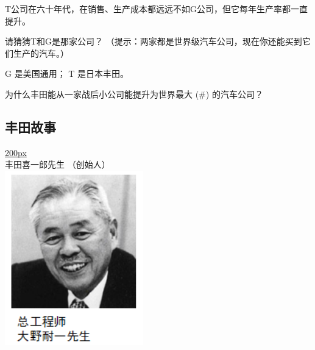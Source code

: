 T公司在六十年代，在销售、生产成本都远远不如G公司，但它每年生产率都一直提升。

请猜猜T和G是那家公司？
（提示：两家都是世界级汽车公司，现在你还能买到它们生产的汽车。）

\begin{description}
\item[]
\begin{description}
\tightlist
\item[]
= = = = = = = = = = = =
\end{description}
\end{description}

G 是美国通用； T 是日本丰田。

为什么丰田能从一家战后小公司能提升为世界最大 (\#) 的汽车公司？

\begin{description}
\item[]
\end{description}

\hypertarget{ux4e30ux7530ux6545ux4e8b}{%
\subsection{丰田故事}\label{ux4e30ux7530ux6545ux4e8b}}

\href{文件:ToyotaPresidentPicture1.png}{200px}\\
丰田喜一郎先生 （创始人）\\

\includegraphics[width=6cm]{大野耐一.png}

